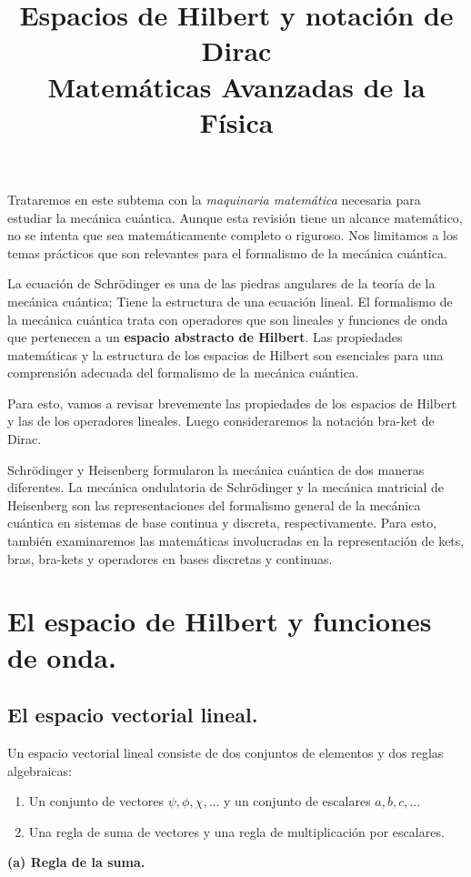 
\usepackage{standalone}
\usepackage{geometry}
\title{Espacios de Hilbert y notación de Dirac \\ \large {Matemáticas Avanzadas de la Física}  \vspace{-1.5\baselineskip}}
\date{}
\author{}

\renewcommand\labelenumii{\theenumi.{\arabic{enumii}}}
\maketitle
\fontsize{14}{14}\selectfont
Trataremos en este subtema con la \emph{maquinaria matemática} necesaria para estudiar la mecánica cuántica. Aunque esta revisión tiene un alcance matemático, no se intenta que sea matemáticamente completo o riguroso. Nos limitamos a los temas prácticos que son relevantes para el formalismo de la mecánica cuántica.
\par
La ecuación de Schrödinger es una de las piedras angulares de la teoría de la mecánica cuántica; Tiene la estructura de una ecuación lineal. El formalismo de la mecánica cuántica trata con operadores que son lineales y funciones de onda que pertenecen a un \textbf{espacio abstracto de Hilbert}. Las propiedades matemáticas y la estructura de los espacios de Hilbert son esenciales para una comprensión adecuada del formalismo de la mecánica cuántica.
\par
Para esto, vamos a revisar brevemente las propiedades de los espacios de Hilbert y las de los operadores lineales. Luego consideraremos la notación bra-ket de Dirac.
\par
Schrödinger y Heisenberg formularon la mecánica cuántica de dos maneras diferentes. La mecánica ondulatoria de Schrödinger y la mecánica matricial de Heisenberg son las representaciones del formalismo general de la mecánica cuántica en sistemas de base continua y discreta, respectivamente. Para esto, también examinaremos las matemáticas involucradas en la representación de kets, bras, bra-kets y operadores en bases discretas y continuas.
\section{El espacio de Hilbert y funciones de onda.}
\subsection{El espacio vectorial lineal.}
Un espacio vectorial lineal consiste de dos conjuntos de elementos y dos reglas algebraicas:
\begin{enumerate}
\item Un conjunto de vectores $\psi, \phi, \chi, \ldots$ y un conjunto de escalares $a, b, c, \ldots$
\item Una regla de suma de vectores y una regla de multiplicación por escalares.
\end{enumerate}
\textbf{(a) Regla de la suma.}

